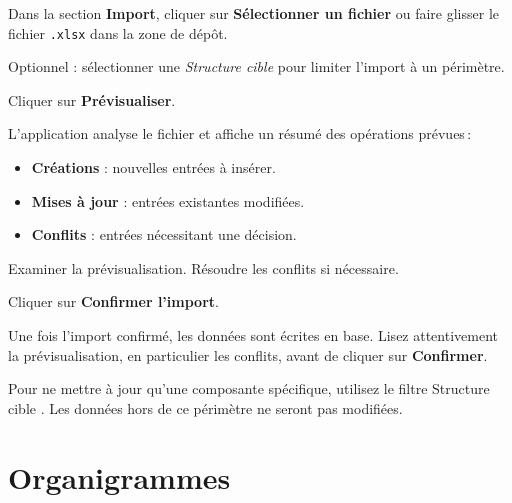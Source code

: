 \begin{steps}
  \item Dans la section \textbf{Import}, cliquer sur \textbf{S\'electionner un fichier} ou faire glisser le fichier \texttt{.xlsx} dans la zone de d\'ep\^ot.
  \item Optionnel : s\'electionner une \textit{Structure cible} pour limiter l'import \`a un p\'erim\`etre.
  \item Cliquer sur \textbf{Pr\'evisualiser}.
  \item L'application analyse le fichier et affiche un r\'esum\'e des op\'erations pr\'evues\,:
    \begin{itemize}
      \item \textbf{Cr\'eations} : nouvelles entr\'ees \`a ins\'erer.
      \item \textbf{Mises \`a jour} : entr\'ees existantes modifi\'ees.
      \item \textbf{Conflits} : entr\'ees n\'ecessitant une d\'ecision.
    \end{itemize}
  \item Examiner la pr\'evisualisation. R\'esoudre les conflits si n\'ecessaire.
  \item Cliquer sur \textbf{Confirmer l'import}.
\end{steps}


\begin{warnbox}
  Une fois l'import confirm\'e, les donn\'ees sont \'ecrites en base. Lisez attentivement la pr\'evisualisation, en particulier les conflits, avant de cliquer sur \textbf{Confirmer}.
\end{warnbox}

\begin{tipbox}
  Pour ne mettre \`a jour qu'une composante sp\'ecifique, utilisez le filtre \og Structure cible \fg{}. Les donn\'ees hors de ce p\'erim\`etre ne seront pas modifi\'ees.
\end{tipbox}

\section{Organigrammes}

